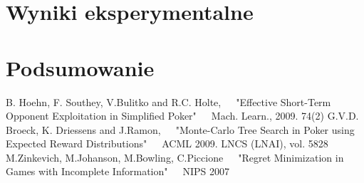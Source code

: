 \documentclass[licencjacka]{pracamgr}
\begin{document}
\chapter{Wyniki eksperymentalne}

\chapter{Podsumowanie}

\begin{thebibliography}{99}
 B. Hoehn, F. Southey, V.Bulitko and R.C. Holte, $\;\;\;$
"Effective Short-Term Opponent Exploitation in Simplified Poker" $\;\;\;$ Mach. Learn., 2009. 74(2)
 G.V.D. Broeck, K. Driessens and J.Ramon, $\;\;\;$
"Monte-Carlo Tree Search in Poker using Expected Reward Distributions" $\;\;\;$
ACML 2009. LNCS (LNAI), vol. 5828
 M.Zinkevich, M.Johanson, M.Bowling, C.Piccione $\;\;\;$ "Regret Minimization in Games with Incomplete
Information" $\;\;\;$ NIPS 2007
\end{thebibliography}
\end{document}

